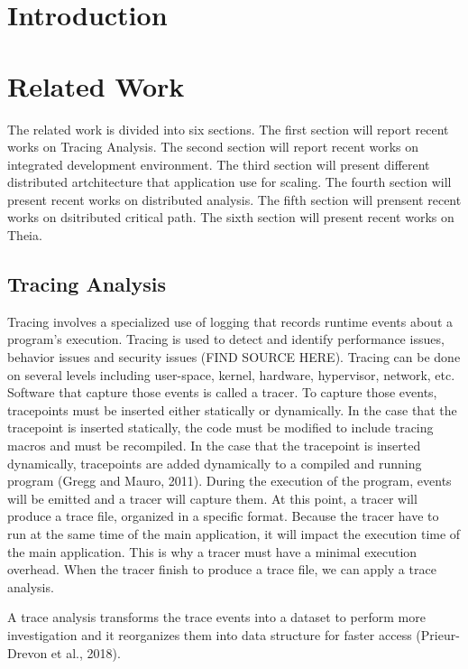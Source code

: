 \label{sec:architecture}

\section{Introduction}

\section{Related Work}

The related work is divided into six sections. The ﬁrst section will report recent works on Tracing Analysis. The second section will report recent works on integrated development environment. The third section will present different distributed artchitecture that application use for scaling. The fourth section will present recent works on distributed analysis. The fifth section will prensent recent works on dsitributed critical path. The sixth section will present recent works on Theia.


\subsection{Tracing Analysis}

 Tracing involves a specialized use of logging that records runtime events about a program's execution. Tracing is used to detect and identify performance issues, behavior issues and security issues (FIND SOURCE HERE). Tracing can be done on several levels including user-space, kernel, hardware, hypervisor, network, etc. Software that capture those events is called a tracer. To capture those events, tracepoints must be inserted either statically or dynamically. In the case that the tracepoint is inserted statically, the code must be modified to include tracing macros and must be recompiled. In the case that the tracepoint is inserted dynamically, tracepoints are added dynamically to a compiled and running program (Gregg and Mauro, 2011). During the execution of the program, events will be emitted and a tracer will capture them. At this point, a tracer will produce a trace file, organized in a specific format. Because the tracer have to run at the same time of the main application, it will impact the execution time of the main application. This is why a tracer must have a minimal execution overhead. When the tracer finish to produce a trace file, we can apply a trace analysis.

 A trace analysis transforms the trace events into a dataset to perform more investigation and it reorganizes them into data structure for faster access (Prieur-Drevon et al., 2018).

